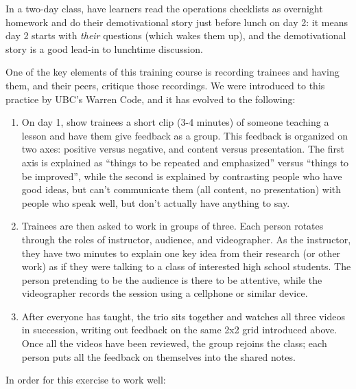 
In a two-day class, have learners read the operations checklists as
overnight homework and do their demotivational story just before
lunch on day 2: it means day 2 starts with \emph{their} questions
(which wakes them up), and the demotivational story is a good
lead-in to lunchtime discussion.


One of the key elements of this training course is recording trainees
and having them, and their peers, critique those recordings. We were
introduced to this practice by UBC's Warren Code, and it has evolved to
the following:

\begin{enumerate}

\item
  On day 1, show trainees a short clip (3-4 minutes) of someone teaching
  a lesson and have them give feedback as a group. This feedback is
  organized on two axes: positive versus negative, and content versus
  presentation. The first axis is explained as ``things to be repeated
  and emphasized'' versus ``things to be improved'', while the second is
  explained by contrasting people who have good ideas, but can't
  communicate them (all content, no presentation) with people who speak
  well, but don't actually have anything to say.

\item
  Trainees are then asked to work in groups of three. Each person
  rotates through the roles of instructor, audience, and videographer.
  As the instructor, they have two minutes to explain one key idea from
  their research (or other work) as if they were talking to a class of
  interested high school students. The person pretending to be the
  audience is there to be attentive, while the videographer records the
  session using a cellphone or similar device.

\item
  After everyone has taught, the trio sits together and watches all
  three videos in succession, writing out feedback on the same 2x2 grid
  introduced above. Once all the videos have been reviewed, the group
  rejoins the class; each person puts all the feedback on themselves
  into the shared notes.

\end{enumerate}

In order for this exercise to work well:

